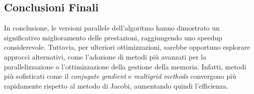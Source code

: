 \documentclass[12pt,a4paper,openany,twoside]{article}
\begin{document}
\subsection{Conclusioni Finali}
In conclusione, le versioni parallele dell'algoritmo hanno dimostrato un significativo miglioramento delle prestazioni, raggiungendo uno speedup considerevole. Tuttavia, per ulteriori ottimizzazioni, sarebbe opportuno esplorare approcci alternativi, come l'adozione di metodi più avanzati per la parallelizzazione o l'ottimizzazione della gestione della memoria. Infatti, metodi più sofisticati come il \textit{conjugate gradient} \cite{10.1145/882262.882364} e \textit{multigrid methods} \cite{10.1145/1198555.1198784, 10.1145/1198555.1198795} convergono più rapidamente rispetto al metodo di Jacobi, aumentando quindi l'efficienza.




\end{document}
